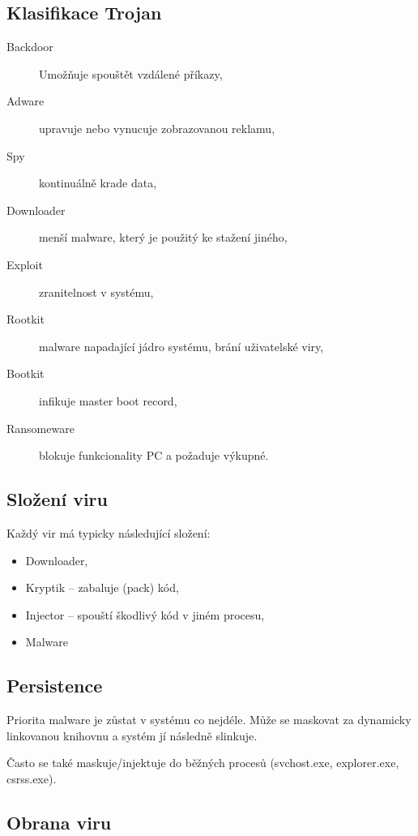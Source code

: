 \subsection*{Klasifikace Trojan}

\begin{description}
    \item[Backdoor] Umožňuje spouštět vzdálené příkazy,
    \item[Adware] upravuje nebo vynucuje zobrazovanou reklamu,
    \item[Spy] kontinuálně krade data,
    \item[Downloader] menší malware, který je použitý ke stažení jiného,
    \item[Exploit] zranitelnost v systému,
    \item[Rootkit] malware napadající jádro systému, brání uživatelské viry,
    \item[Bootkit] infikuje master boot record,
    \item[Ransomeware] blokuje funkcionality PC a požaduje výkupné.
\end{description}

\subsection*{Složení viru}

Každý vir má typicky následující složení:

\begin{itemize}
    \item Downloader,
    \item Kryptik -- zabaluje (pack) kód,
    \item Injector -- spouští škodlivý kód v jiném procesu,
    \item Malware
\end{itemize}

\subsection*{Persistence}

Priorita malware je zůstat v systému co nejdéle.
Může se maskovat za dynamicky linkovanou knihovnu a systém jí následně slinkuje.

Často se také maskuje/injektuje do běžných procesů (svchost.exe, explorer.exe, csrss.exe).

\subsection*{Obrana viru}

